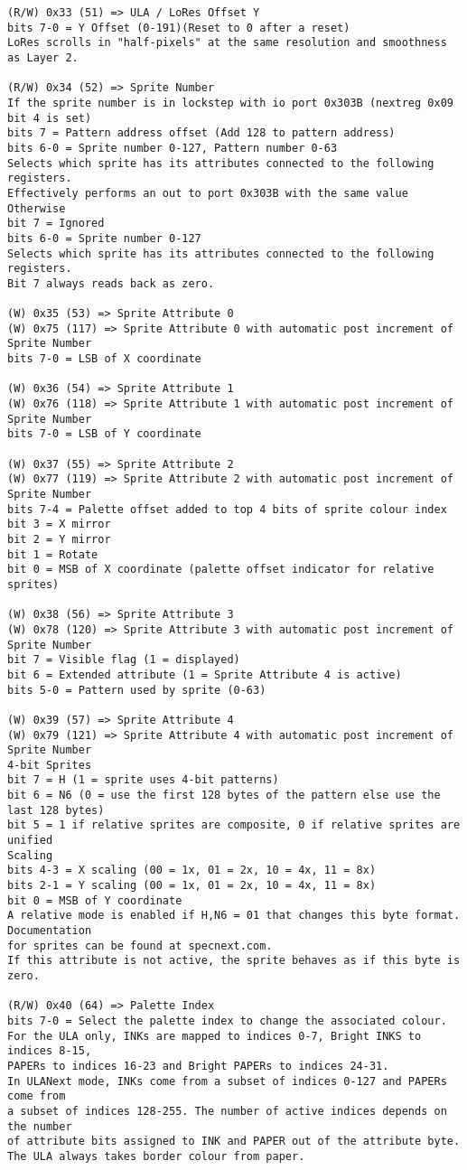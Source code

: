 \begin{verbatim}
(R/W) 0x33 (51) => ULA / LoRes Offset Y
bits 7-0 = Y Offset (0-191)(Reset to 0 after a reset)
LoRes scrolls in "half-pixels" at the same resolution and smoothness as Layer 2.

(R/W) 0x34 (52) => Sprite Number
If the sprite number is in lockstep with io port 0x303B (nextreg 0x09 bit 4 is set)
bits 7 = Pattern address offset (Add 128 to pattern address)
bits 6-0 = Sprite number 0-127, Pattern number 0-63
Selects which sprite has its attributes connected to the following registers.
Effectively performs an out to port 0x303B with the same value
Otherwise
bit 7 = Ignored
bits 6-0 = Sprite number 0-127
Selects which sprite has its attributes connected to the following registers.
Bit 7 always reads back as zero.

(W) 0x35 (53) => Sprite Attribute 0
(W) 0x75 (117) => Sprite Attribute 0 with automatic post increment of Sprite Number
bits 7-0 = LSB of X coordinate

(W) 0x36 (54) => Sprite Attribute 1
(W) 0x76 (118) => Sprite Attribute 1 with automatic post increment of Sprite Number
bits 7-0 = LSB of Y coordinate

(W) 0x37 (55) => Sprite Attribute 2
(W) 0x77 (119) => Sprite Attribute 2 with automatic post increment of Sprite Number
bits 7-4 = Palette offset added to top 4 bits of sprite colour index
bit 3 = X mirror
bit 2 = Y mirror
bit 1 = Rotate
bit 0 = MSB of X coordinate (palette offset indicator for relative sprites)

(W) 0x38 (56) => Sprite Attribute 3
(W) 0x78 (120) => Sprite Attribute 3 with automatic post increment of Sprite Number
bit 7 = Visible flag (1 = displayed)
bit 6 = Extended attribute (1 = Sprite Attribute 4 is active)
bits 5-0 = Pattern used by sprite (0-63)

(W) 0x39 (57) => Sprite Attribute 4
(W) 0x79 (121) => Sprite Attribute 4 with automatic post increment of Sprite Number
4-bit Sprites
bit 7 = H (1 = sprite uses 4-bit patterns)
bit 6 = N6 (0 = use the first 128 bytes of the pattern else use the last 128 bytes)
bit 5 = 1 if relative sprites are composite, 0 if relative sprites are unified
Scaling
bits 4-3 = X scaling (00 = 1x, 01 = 2x, 10 = 4x, 11 = 8x)
bits 2-1 = Y scaling (00 = 1x, 01 = 2x, 10 = 4x, 11 = 8x)
bit 0 = MSB of Y coordinate
A relative mode is enabled if H,N6 = 01 that changes this byte format. Documentation
for sprites can be found at specnext.com.
If this attribute is not active, the sprite behaves as if this byte is zero.

(R/W) 0x40 (64) => Palette Index
bits 7-0 = Select the palette index to change the associated colour.
For the ULA only, INKs are mapped to indices 0-7, Bright INKS to indices 8-15,
PAPERs to indices 16-23 and Bright PAPERs to indices 24-31.
In ULANext mode, INKs come from a subset of indices 0-127 and PAPERs come from
a subset of indices 128-255. The number of active indices depends on the number
of attribute bits assigned to INK and PAPER out of the attribute byte.
The ULA always takes border colour from paper.


\end{verbatim}
